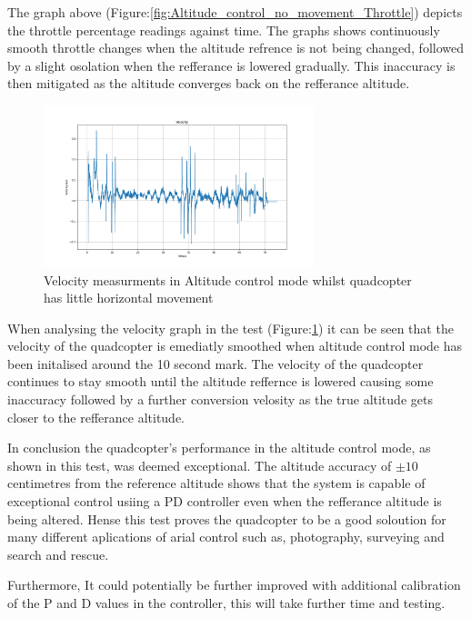 \documentclass{report}
\begin{document}
The graph above (Figure:\ref{fig:Altitude_control_no_movement_Throttle}) depicts the throttle percentage readings against time. The graphs shows continuously smooth throttle changes when the altitude refrence is not being changed, followed by a slight osolation when the refferance is lowered gradually. This inaccuracy is then mitigated as the altitude converges back on the refferance altitude.

\begin{figure}[H]
  \centering
  \includegraphics[width=0.7\textwidth]{Pictures/Velocity_Altitude_hold_indoors.png}
  \caption{Velocity measurments in Altitude control mode whilst quadcopter has little horizontal movement}
  \label{fig:Altitude_control_no_movement_Velocity}
\end{figure}
When analysing the velocity graph in the test (Figure:\ref{fig:Altitude_control_no_movement_Velocity}) it can be seen that the velocity of the quadcopter is emediatly smoothed when altitude control mode has been initalised around the 10 second mark. The velocity of the quadcopter continues to stay smooth until the altitude reffernce is lowered causing some inaccuracy followed by a further conversion velosity as the true altitude gets closer to the refferance altitude.

In conclusion the quadcopter's performance in the altitude control mode, as
shown in this test, was deemed exceptional. The altitude accuracy of \(\pm10\)
centimetres from the reference altitude shows that the system is capable of
exceptional control usiing a PD controller even when the refferance altitude is
being altered. Hense this test proves the quadcopter to be a good soloution for
many different aplications of arial control such as, photography, surveying and
search and rescue. 

Furthermore, It could potentially be further improved with additional
calibration of the P and D values in the controller, this will take further time
and testing. 
\end{document}
